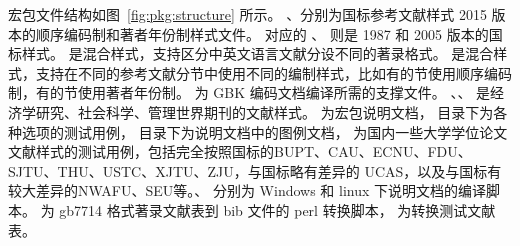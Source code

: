 \documentclass[11pt]{article} %
\begin{document}
宏包文件结构如图~\ref{fig:pkg:structure} 所示。
、分别为国标参考文献样式 2015 版本的顺序编码制和著者年份制样式文件。
对应的 、 则是 1987 和 2005 版本的国标样式。
 是混合样式，支持区分中英文语言文献分设不同的著录格式。
 是混合样式，支持在不同的参考文献分节中使用不同的编制样式，比如有的节使用顺序编码制，有的节使用著者年份制。
 为 GBK 编码文档编译所需的支撑文件。
、、 是经济学研究、社会科学、管理世界期刊的文献样式。%
 为宏包说明文档， 目录下为各种选项的测试用例，
 目录下为说明文档中的图例文档， 为国内一些大学学位论文文献样式的测试用例，包括完全按照国标的BUPT、CAU、ECNU、FDU、SJTU、THU、USTC、XJTU、ZJU，与国标略有差异的 UCAS，以及与国标有较大差异的NWAFU、SEU等。、 分别为 Windows 和 linux 下说明文档的编译脚本。 为 gb7714 格式著录文献表到 bib 文件的 perl 转换脚本， 为转换测试文献表。
\end{document}

